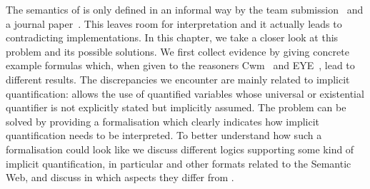 









The semantics of \nthreelogic is only defined in an informal way by the \wwwc team submission~\cite{Notation3} and a journal paper~\cite{N3Logic}. 
This leaves room for interpretation and it actually leads to contradicting implementations. 
In this chapter, we take a closer look at this problem and its possible solutions. %
We first collect evidence %
by giving concrete example formulas which, when given to the reasoners Cwm~\cite{cwm} and EYE~\cite{eye}, lead to different results. 
The discrepancies we encounter are mainly related to 
implicit quantification: \nthree allows the use of quantified variables whose universal or existential quantifier is not explicitly stated but implicitly assumed.
The problem can be solved by providing a formalisation which clearly indicates how implicit quantification needs to be interpreted. To better understand how such a formalisation 
could look like we discuss different logics supporting some kind of implicit quantification, in particular \rdf and other formats related to the Semantic Web, and discuss
in which aspects they differ 
from \nthree.

% 


